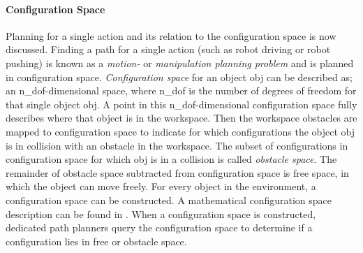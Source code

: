 \paragraph{Configuration Space}
Planning for a single action and its relation to the configuration space is now discussed. Finding a path for a single action (such as robot driving or robot pushing) is known as a \textit{motion-} or \textit{manipulation planning problem} and is planned in configuration space. \textit{Configuration space} for an object \gls{obj} can be described as; an \gls{n_dof}-dimensional space, where \gls{n_dof} is the number of degrees of freedom for that single object \gls{obj}. A point in this \gls{n_dof}-dimensional configuration space fully describes where that object is in the workspace. Then the workspace obstacles are mapped to configuration space to indicate for which configurations the object \gls{obj} is in collision with an obstacle in the workspace. The subset of configurations in configuration space for which \gls{obj} is in a collision is called \textit{obstacle space}. The remainder of obstacle space subtracted from configuration space is free space, in which the object can move freely. For every object in the environment, a configuration space can be constructed. A mathematical configuration space description can be found in . When a configuration space is constructed, dedicated path planners query the configuration space to determine if a configuration lies in free or obstacle space.\bs

